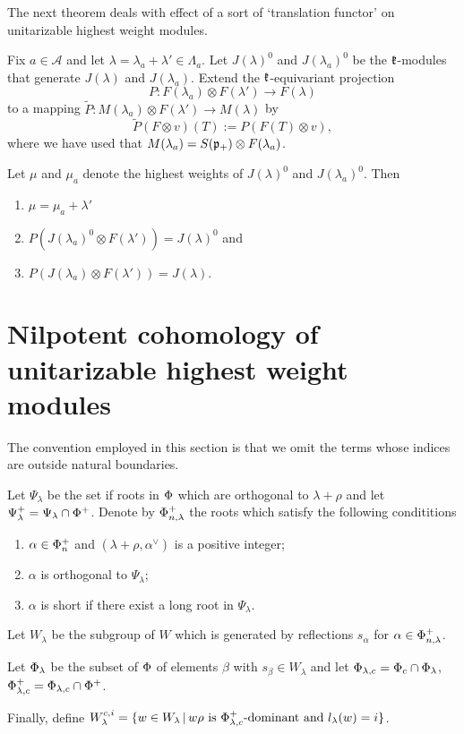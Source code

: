 The next theorem  deals with effect of a sort of `translation functor' on unitarizable highest weight modules.
\begin{theorem}
 Fix $a\in\mathcal{A}$ and let $\lambda = \lambda_a + \lambda'\in\Lambda_a$. Let $J(\lambda)^0$ and $J(\lambda_a)^0$ be the $\mathfrak{k}$-modules that generate $J(\lambda)$ and $J(\lambda_a)$. Extend the $\mathfrak{k}$-equivariant projection \[P:F(\lambda_a)\otimes F(\lambda') \to F(\lambda)\] to a mapping $\widetilde{P}:M(\lambda_a) \otimes F(\lambda') \to M(\lambda)$ by \[\widetilde{P}(F\otimes v) (T) := P(F(T)\otimes v),\]
  where we have used that $M(\lambda_a) = S(\mathfrak{p}_+)\otimes F(\lambda_a)$.

Let $\mu$ and $\mu_a$ denote the highest weights of  $J(\lambda)^0$ and $J(\lambda_a)^0$. Then
 \begin{enumerate}
  \item $\mu  = \mu_a+\lambda'$
  \item $P(J(\lambda_a)^0\otimes F(\lambda')) = J(\lambda)^0$ and 
  \item $P(J(\lambda_a)\otimes F(\lambda')) = J(\lambda)$.
 \end{enumerate}
\end{theorem}

\section{Nilpotent cohomology of unitarizable highest weight modules}

The convention employed in this section is that we omit the terms whose indices are outside natural boundaries. 

\begin{definition}\label{def:cohomology_roots}
Let $\Psi_\lambda$ be the set if roots in $\Phi$ which are orthogonal to $\lambda+\rho$ and let $\Psi_\lambda^+ = \Psi_\lambda \cap \Phi^+$. Denote by $\Phi_{n,\lambda}^+$ the roots which satisfy the following condititions
 \begin{enumerate}
    \item $\alpha \in \Phi_n^+$ and $(\lambda+\rho,\alpha^\vee)$ is a positive integer;
    \item $\alpha$ is orthogonal to $\Psi_\lambda$;
    \item $\alpha$ is short if there exist a long root in $\Psi_\lambda$.
 \end{enumerate}
 
 Let $W_\lambda$ be the subgroup of $W$ which is generated by reflections $s_\alpha$ for $\alpha\in \Phi_{n,\lambda}^+$.
 
 Let $\Phi_\lambda$ be the subset of $\Phi$ of elements $\beta$ with $s_\beta\in W_\lambda$ and let $\Phi_{\lambda,c} = \Phi_c \cap \Phi_\lambda$, $\Phi_{\lambda,c}^+ = \Phi_{\lambda,c} \cap \Phi^+$.
 
 Finally, define  $W^{c,i}_\lambda = \{ w \in W_\lambda \, |\, w \rho \text{ is } \Phi^+_{\lambda, c}\text{-dominant and } l_\lambda(w)=i \}$.
\end{definition}

